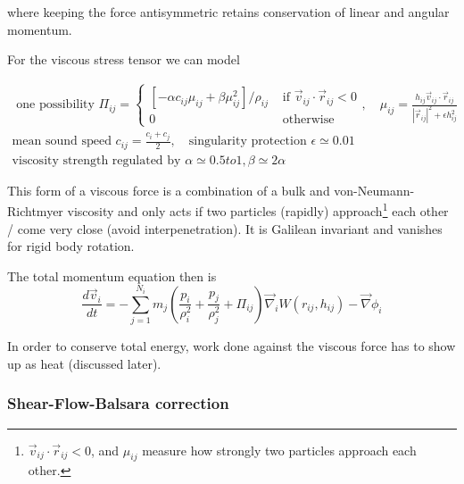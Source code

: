 where keeping the force antisymmetric retains conservation of linear and angular momentum.

For the viscous stress tensor we can model

\begin{equation}
    \begin{gathered}
        \text { one possibility } \Pi_{i j}=\left\{\begin{array}{cc}
            {\left[-\alpha c_{i j} \mu_{i j}+\beta \mu_{i j}^2\right] / \rho_{i j}} & \text { if } \vec{v}_{i j} \cdot \vec{r}_{i j}<0 \\
            0 & \text { otherwise }
            \end{array}, \quad \mu_{i j}=\frac{h_{i j} \vec{v}_{i j} \cdot \vec{r}_{i j}}{\left|\vec{r}_{i j}\right|^2+\epsilon h_{i j}^2}\right. \\
        \text{mean sound speed } c_{ij} = \frac{c_i + c_j}{2}, \quad \text{singularity protection } \epsilon \simeq 0.01 \\
        \text{viscosity strength regulated by } \alpha \simeq 0.5 to 1, \beta \simeq 2 \alpha
    \end{gathered}
\end{equation}

This form of a viscous force is a combination of a bulk and von-Neumann-Richtmyer viscosity and only acts if two particles (rapidly) approach\footnote{$\vec{v}_{i j} \cdot \vec{r}_{i j}<0$, and $\mu_{ij}$ measure how strongly two particles approach each other.} each other / come very close (avoid interpenetration). It is Galilean invariant and vanishes for rigid body rotation.

\begin{mdframed}[style = padded]
    The total momentum equation then is
    \begin{equation}
        \frac{d \vec{v}_i}{d t}=-\sum_{j=1}^{N_i} m_j\left(\frac{p_i}{\rho_i^2}+\frac{p_j}{\rho_j^2}+\Pi_{i j}\right) \vec{\nabla}_i W\left(r_{i j}, h_{i j}\right)-\vec{\nabla} \phi_i
    \end{equation}
\end{mdframed}


In order to conserve total energy, work done against the viscous force has to show up as heat (discussed later).

\subsubsection{Shear-Flow-Balsara correction}

